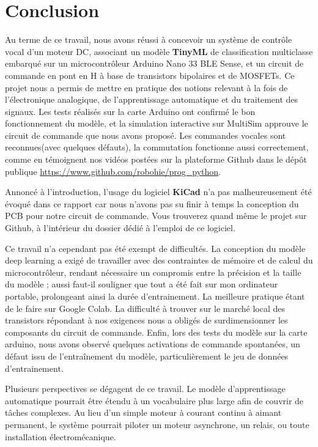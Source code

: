 \documentclass[a4paper,12pt,twoside]{report}
\theoremstyle{definition}
\theoremstyle{plain}
\theoremstyle{remark}
\begin{document}
\chapter{Conclusion}
\label{section:conclusion}
Au terme de ce travail, nous avons réussi à concevoir un système de contrôle vocal d'un moteur \ac{DC}, associant un modèle \textbf{TinyML} de classification multiclasse embarqué sur un  microcontrôleur Arduino Nano 33 \ac{BLE} Sense, et un circuit de commande en pont en H à base de transistors bipolaires et de \acp{MOSFET}. Ce projet nous a permis de mettre en pratique des notions relevant à la fois de l'électronique analogique, de l'apprentissage automatique et du traitement des signaux. Les tests réalisés sur la carte Arduino ont confirmé le bon fonctionnement du modèle, et la simulation interactive sur MultiSim approuve le circuit de commande que nous avons proposé. Les commandes vocales sont reconnues(avec quelques défauts), la commutation fonctionne aussi correctement, comme en témoignent nos vidéos postées sur la plateforme Github dans le dépôt publique \url{https://www.github.com/robohie/prog_python}.

Annoncé à l'introduction, l'usage du logiciel \textbf{KiCad} n'a pas malheureusement été évoqué dans ce rapport car nous n'avons pas su finir à temps la conception du \ac{PCB} pour notre circuit de commande. Vous trouverez quand même le projet sur Github, à l'intérieur du dossier dédié à l'emploi de ce logiciel.

Ce travail n'a cependant pas été exempt de difficultés. La conception du modèle deep learning a exigé de travailler avec des contraintes de mémoire et de calcul du microcontrôleur, rendant nécessaire un compromis entre la précision et la taille du modèle ; aussi faut-il souligner que tout a été fait sur mon ordinateur portable, prolongeant ainsi la durée d'entrainement. La meilleure pratique étant de le faire sur Google Colab. La difficulté à trouver sur le marché local des transistors répondant à nos exigences nous a obligés de surdimensionner les composants du circuit de commande. Enfin, lors des tests du modèle sur la carte arduino, nous avons observé quelques activations de commande spontanées, un défaut issu de l'entraînement du modèle, particulièrement le jeu de données d'entrainement.

Plusieurs perspectives se dégagent de ce travail. Le modèle d'apprentissage automatique pourrait être étendu à un vocabulaire plus large afin de couvrir de tâches complexes. Au lieu d'un simple moteur à courant continu à aimant permanent, le système pourrait piloter un moteur asynchrone, un relais, ou toute installation électromécanique.
\end{document}
